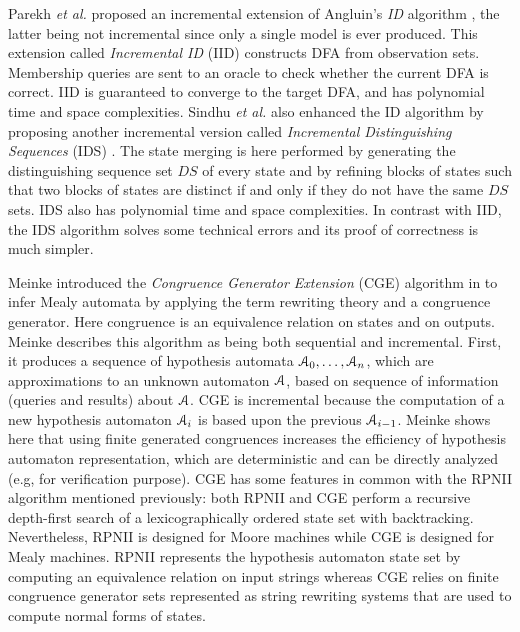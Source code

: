 Parekh \emph{et al.} \cite{parekh98} proposed an incremental extension
of Angluin's \textit{ID} algorithm \cite{ANGLUIN198176}, the
latter being not incremental since only a single model is
ever produced. This extension called \textit{Incremental ID}
(IID) constructs DFA from observation sets. Membership queries
are sent to an oracle to check whether the current DFA is
correct. IID is guaranteed to converge to the target DFA, and has
polynomial time and space complexities. Sindhu \emph{et al.} also
enhanced the ID algorithm by proposing another incremental
version called \textit{Incremental Distinguishing Sequences}
(IDS) \cite{journals/corr/abs-1206-2691}. The state merging is
here performed by generating the distinguishing sequence set $DS$
of every state and by refining blocks of states such that two
blocks of states are distinct if and only if they do not have the
same $DS$ sets. IDS also has polynomial time and space
complexities. In contrast with IID, the IDS algorithm solves some
technical errors and its proof of correctness is much simpler.

Meinke introduced the \textit{Congruence Generator Extension}
(CGE) algorithm in \cite{meinkeCGE} to infer Mealy automata by
applying the term rewriting theory and a congruence generator.
Here congruence is an equivalence relation on states and on
outputs. Meinke describes this algorithm as being both sequential
and incremental. First, it produces a sequence of hypothesis
automata $\EuScript{A}_0, \dots, \EuScript{A}_n$, which are
approximations to an unknown automaton $\EuScript{A}$, based on
sequence of information (queries and results) about
$\EuScript{A}$. CGE is incremental because the computation
of a new hypothesis automaton $\EuScript{A}_i$ is based upon the
previous $\EuScript{A}_{i-1}$. Meinke shows here that using
finite generated congruences increases the efficiency of
hypothesis automaton representation, which are deterministic
and can be directly analyzed (e.g, for verification purpose). CGE
has some features in common with the RPNII algorithm mentioned
previously: both RPNII and CGE perform a recursive depth-first
search of a lexicographically ordered state set with
backtracking. Nevertheless, RPNII is designed for Moore machines
while CGE is designed for Mealy machines. RPNII represents the
hypothesis automaton state set by computing an equivalence
relation on input strings whereas CGE relies on finite congruence
generator sets represented as string rewriting systems that are
used to compute normal forms of states.

